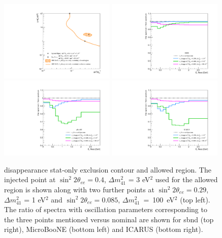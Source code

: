 \begin{figure}[h!]
    \centering
    \includegraphics[width = 0.49\textwidth]{figures-chap6/overlays/nue_disapp_stat_osc_markers.pdf}
    \includegraphics[width = 0.49\textwidth]{figures-chap6/spectra/nue_disapp_spectra_ratio_sbnd.pdf}
    \includegraphics[width = 0.49\textwidth]{figures-chap6/spectra/nue_disapp_spectra_ratio_uboone.pdf}
    \includegraphics[width = 0.49\textwidth]{figures-chap6/spectra/nue_disapp_spectra_ratio_icarus.pdf}
    \caption[Ratio of \nue disappearance spectra with the oscillation parameters shown on the statistical only contour.]{\nue disappearance stat-only exclusion contour and allowed region. The injected point at $\sin^2{2\theta_{ee}} = 0.4$, $\Delta m^2_{41}$ = 3 eV$^2$ used for the allowed region is shown along with two further points at $\sin^2{2\theta_{ee}} = 0.29$, $\Delta m^2_{41}$ = 1 eV$^2$ and \mbox{$\sin^2{2\theta_{ee}} = 0.085$}, \mbox{$\Delta m^2_{41}$ = 100 eV$^2$} (top left). The ratio of spectra with oscillation parameters corresponding to the three points mentioned versus nominal are shown for \gls{sbnd} (top right), MicroBooNE (bottom left) and ICARUS (bottom right).}
    \label{fig:nue_disapp_spectra_ratios}
\end{figure}

